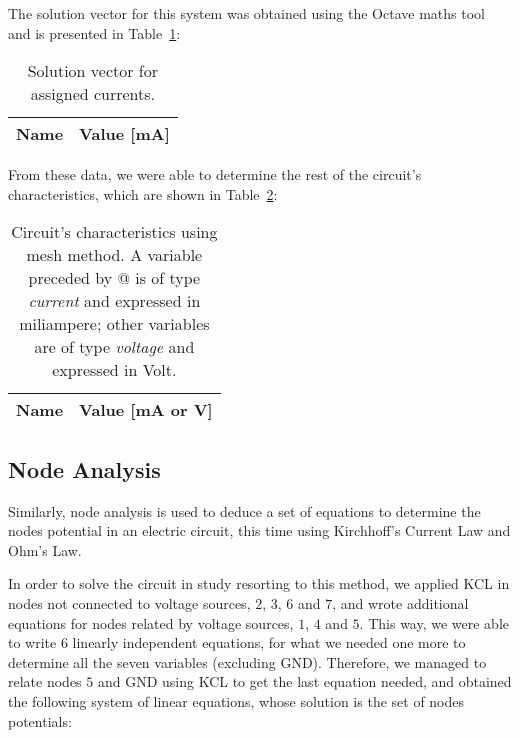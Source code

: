 \vspace{1mm}

The solution vector for this system was obtained using the Octave maths tool and is presented in Table~\ref{tab:meshvec}:

\begin{table}[H]
  \centering
  \begin{tabular}{|l|r|}
    \hline    
    {\bf Name} & {\bf Value [mA]} \\ \hline
    
  \end{tabular}
  \caption{Solution vector for assigned currents.}
  \label{tab:meshvec}
\end{table}

From these data, we were able to determine the rest of the circuit's characteristics, which are shown in Table~\ref{tab:meshtab}:

\begin{table}[H]
  \centering
  \begin{tabular}{|l|r|}
    \hline    
    {\bf Name} & {\bf Value [mA or V]} \\ \hline
    
  \end{tabular}
  \caption{Circuit's characteristics using mesh method. A variable preceded by @ is of type {\em current}
    and expressed in miliampere; other variables are of type {\it voltage} and expressed in
    Volt.}
  \label{tab:meshtab}
\end{table}


\subsection{Node Analysis}

Similarly, node analysis is used to deduce a set of equations to determine the nodes potential in an electric circuit, this time using Kirchhoff’s Current Law and Ohm's Law.

In order to solve the circuit in study resorting to this method, we applied KCL in nodes not connected to voltage sources, $2$, $3$, $6$ and $7$, and wrote additional equations for nodes related by voltage sources, $1$, $4$ and $5$. This way, we were able to write 6 linearly independent equations, for what we needed one more to determine all the seven variables (excluding GND). Therefore, we managed to relate nodes $5$ and GND using KCL to get the last equation needed, and obtained the following system of linear equations, whose solution is the set of nodes potentials:

